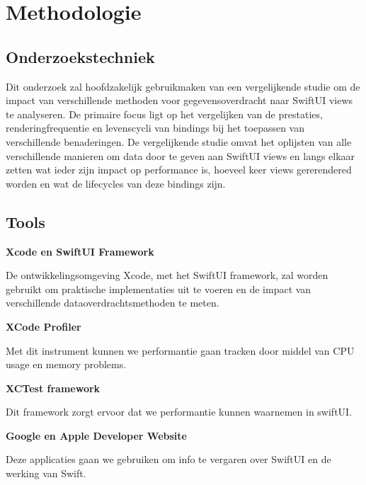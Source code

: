 


\section{Methodologie}%
\label{sec:methodologie}

\subsection{Onderzoekstechniek}
Dit onderzoek zal hoofdzakelijk gebruikmaken van een vergelijkende studie om de impact van verschillende methoden voor gegevensoverdracht naar SwiftUI views te analyseren. De primaire focus ligt op het vergelijken van de prestaties, renderingfrequentie en levenscycli van bindings bij het toepassen van verschillende benaderingen. De vergelijkende studie omvat het oplijsten van alle verschillende manieren om data door te geven aan SwiftUI views en langs elkaar zetten wat ieder zijn impact op performance is, hoeveel keer views gererendered  worden en wat de lifecycles van deze bindings zijn. 

\subsection{Tools}
\textbf{Xcode en SwiftUI Framework}

De ontwikkelingsomgeving Xcode, met het SwiftUI framework, zal worden gebruikt om praktische implementaties uit te voeren en de impact van verschillende dataoverdrachtsmethoden te meten.

\textbf{XCode Profiler}

Met dit instrument kunnen we performantie gaan tracken door middel van CPU usage en memory problems.

\textbf{XCTest framework}

Dit framework zorgt ervoor dat we performantie kunnen waarnemen in swiftUI.

\textbf{Google en Apple Developer Website}

Deze applicaties gaan we gebruiken om info te vergaren over SwiftUI en de werking van Swift.


